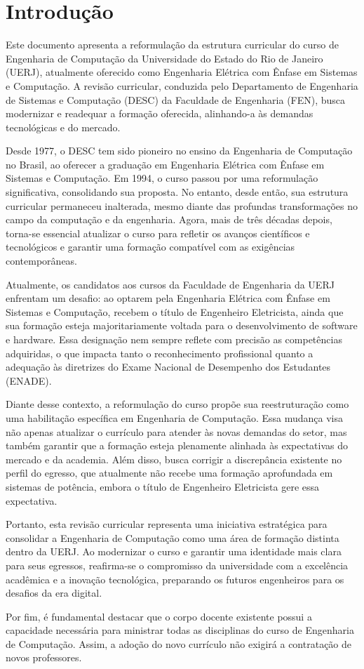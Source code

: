 \chapter{Introdução}
\label{intro} %

Este documento apresenta a reformulação da estrutura curricular do curso de Engenharia de Computação da Universidade do Estado do Rio de Janeiro (UERJ), atualmente oferecido como Engenharia Elétrica com Ênfase em Sistemas e Computação. A revisão curricular, conduzida pelo Departamento de Engenharia de Sistemas e Computação (DESC) da Faculdade de Engenharia (FEN), busca modernizar e readequar a formação oferecida, alinhando-a às demandas tecnológicas e do mercado.

Desde 1977, o DESC tem sido pioneiro no ensino da Engenharia de Computação no Brasil, ao oferecer a graduação em Engenharia Elétrica com Ênfase em Sistemas e Computação. Em 1994, o curso passou por uma reformulação significativa, consolidando sua proposta. No entanto, desde então, sua estrutura curricular permaneceu inalterada, mesmo diante das profundas transformações no campo da computação e da engenharia. Agora, mais de três décadas depois, torna-se essencial atualizar o curso para refletir os avanços científicos e tecnológicos e garantir uma formação compatível com as exigências contemporâneas.

Atualmente, os candidatos aos cursos da Faculdade de Engenharia da UERJ enfrentam um desafio: ao optarem pela Engenharia Elétrica com Ênfase em Sistemas e Computação, recebem o título de Engenheiro Eletricista, ainda que sua formação esteja majoritariamente voltada para o desenvolvimento de software e hardware. Essa designação nem sempre reflete com precisão as competências adquiridas, o que impacta tanto o reconhecimento profissional quanto a adequação às diretrizes do Exame Nacional de Desempenho dos Estudantes (ENADE).

Diante desse contexto, a reformulação do curso propõe sua reestruturação como uma habilitação específica em Engenharia de Computação. Essa mudança visa não apenas atualizar o currículo para atender às novas demandas do setor, mas também garantir que a formação esteja plenamente alinhada às expectativas do mercado e da academia. Além disso, busca corrigir a discrepância existente no perfil do egresso, que atualmente não recebe uma formação aprofundada em sistemas de potência, embora o título de Engenheiro Eletricista gere essa expectativa.

Portanto, esta revisão curricular representa uma iniciativa estratégica para consolidar a Engenharia de Computação como uma área de formação distinta dentro da UERJ. Ao modernizar o curso e garantir uma identidade mais clara para seus egressos, reafirma-se o compromisso da universidade com a excelência acadêmica e a inovação tecnológica, preparando os futuros engenheiros para os desafios da era digital.

Por fim, é fundamental destacar que o corpo docente existente possui a capacidade necessária para ministrar todas as disciplinas do curso de Engenharia de Computação. Assim, a adoção do novo currículo não exigirá a contratação de novos professores.
